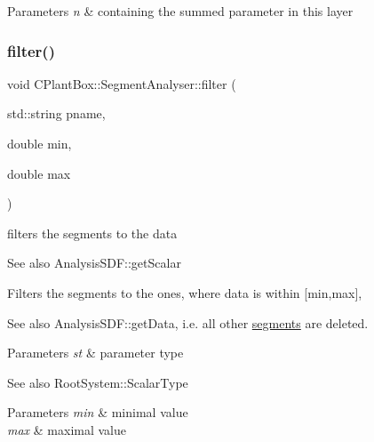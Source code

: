 \begin{DoxyParams}{Parameters}
{\em n} & containing the summed parameter in this layer \\
\hline
\end{DoxyParams}
\mbox{\label{classCPlantBox_1_1SegmentAnalyser_a23c673b6bca999d2ed47059e3e708f86}} 
\subsubsection{\texorpdfstring{filter()}{filter()}\hspace{0.1cm}{\footnotesize\ttfamily [1/2]}}
{\footnotesize\ttfamily void C\+Plant\+Box\+::\+Segment\+Analyser\+::filter (\begin{DoxyParamCaption}\item[{std\+::string}]{pname,  }\item[{double}]{min,  }\item[{double}]{max }\end{DoxyParamCaption})}



filters the segments to the data 

\begin{DoxySeeAlso}{See also}
Analysis\+S\+D\+F\+::get\+Scalar
\end{DoxySeeAlso}
Filters the segments to the ones, where data is within \mbox{[}min,max\mbox{]}, \begin{DoxySeeAlso}{See also}
Analysis\+S\+D\+F\+::get\+Data, i.\+e. all other \hyperlink{classCPlantBox_1_1SegmentAnalyser_a2647967365df14fad069aeee7e66ced6}{segments} are deleted.
\end{DoxySeeAlso}

\begin{DoxyParams}{Parameters}
{\em st} & parameter type \\
\hline
\end{DoxyParams}
\begin{DoxySeeAlso}{See also}
Root\+System\+::\+Scalar\+Type 
\end{DoxySeeAlso}

\begin{DoxyParams}{Parameters}
{\em min} & minimal value \\
\hline
{\em max} & maximal value \\
\hline
\end{DoxyParams}
\mbox{\label{classCPlantBox_1_1SegmentAnalyser_add2f750bb9f709e0bc0d9d187ad03277}} 
